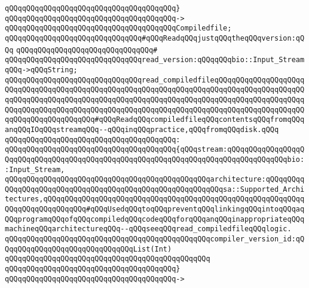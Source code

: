 \verb|qQQqqQQqqQQqqQQqqQQqqQQqqQQqqQQqqQQqqQQq}|\newline
\verb|qQQqqQQqqQQqqQQqqQQqqQQqqQQqqQQqqQQqqQQq->|\newline
\verb|qQQqqQQqqQQqqQQqqQQqqQQqqQQqqQQqqQQqqQQqCompiledfile;|\newline
\newline
\newline
\newline
\verb|qQQqqQQqqQQqqQQqqQQqqQQqqQQqqQQq#qQQqReadqQQqjustqQQqtheqQQqversion:qQQq|\newline
\verb|qQQqqQQqqQQqqQQqqQQqqQQqqQQqqQQq#|\newline
\verb|qQQqqQQqqQQqqQQqqQQqqQQqqQQqqQQqread_version:qQQqqQQqbio::Input_StreamqQQq->qQQqString;|\newline
\newline
\newline
\newline
\verb|qQQqqQQqqQQqqQQqqQQqqQQqqQQqqQQqread_compiledfileqQQqqQQqqQQqqQQqqQQqqQQqqQQqqQQqqQQqqQQqqQQqqQQqqQQqqQQqqQQqqQQqqQQqqQQqqQQqqQQqqQQqqQQqqQQqqQQqqQQqqQQqqQQqqQQqqQQqqQQqqQQqqQQqqQQqqQQqqQQqqQQqqQQqqQQqqQQqqQQqqQQqqQQqqQQqqQQqqQQqqQQqqQQqqQQqqQQqqQQqqQQqqQQqqQQqqQQqqQQqqQQqqQQqqQQqqQQqqQQqqQQqqQQqqQQq#qQQqReadqQQqcompiledfileqQQqcontentsqQQqfromqQQqanqQQqIOqQQqstreamqQQq--qQQqinqQQqpractice,qQQqfromqQQqdisk.qQQq|\newline
\verb|qQQqqQQqqQQqqQQqqQQqqQQqqQQqqQQqqQQqqQQq:|\newline
\verb|qQQqqQQqqQQqqQQqqQQqqQQqqQQqqQQqqQQqqQQq{qQQqstream:qQQqqQQqqQQqqQQqqQQqqQQqqQQqqQQqqQQqqQQqqQQqqQQqqQQqqQQqqQQqqQQqqQQqqQQqqQQqqQQqqQQqbio::Input_Stream,|\newline
\verb|qQQqqQQqqQQqqQQqqQQqqQQqqQQqqQQqqQQqqQQqqQQqqQQqarchitecture:qQQqqQQqqQQqqQQqqQQqqQQqqQQqqQQqqQQqqQQqqQQqqQQqqQQqqQQqqQQqsa::Supported_Architectures,qQQqqQQqqQQqqQQqqQQqqQQqqQQqqQQqqQQqqQQqqQQqqQQqqQQqqQQqqQQqqQQqqQQqqQQqqQQqqQQq#qQQqUsedqQQqtoqQQqpreventqQQqlinkingqQQqintoqQQqaqQQqprogramqQQqofqQQqcompiledqQQqcodeqQQqforqQQqanqQQqinappropriateqQQqmachineqQQqarchitectureqQQq--qQQqseeqQQqread_compiledfileqQQqlogic.|\newline
\verb|qQQqqQQqqQQqqQQqqQQqqQQqqQQqqQQqqQQqqQQqqQQqqQQqcompiler_version_id:qQQqqQQqqQQqqQQqqQQqqQQqqQQqqQQqList(Int)|\newline
\verb|qQQqqQQqqQQqqQQqqQQqqQQqqQQqqQQqqQQqqQQqqQQqqQQq|\newline
\verb|qQQqqQQqqQQqqQQqqQQqqQQqqQQqqQQqqQQqqQQq}|\newline
\verb|qQQqqQQqqQQqqQQqqQQqqQQqqQQqqQQqqQQqqQQq->|\newline
